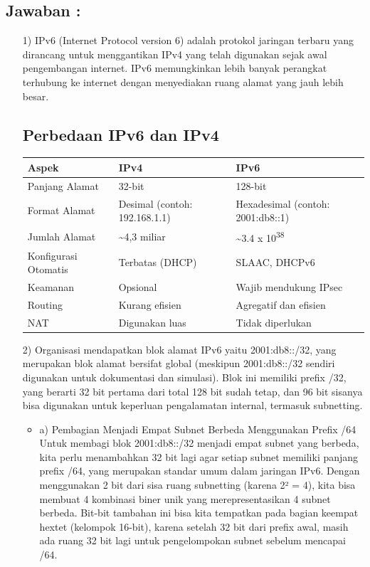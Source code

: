 \documentclass[12pt,a4paper]{article}
\begin{document}
\subsection*{Jawaban :}
\begin{itemize}
    \item[1)] IPv6 (Internet Protocol version 6) adalah protokol jaringan terbaru yang dirancang untuk menggantikan IPv4 yang telah digunakan sejak awal pengembangan internet. IPv6 memungkinkan lebih banyak perangkat terhubung ke internet dengan menyediakan ruang alamat yang jauh lebih besar.

\subsection*{Perbedaan IPv6 dan IPv4}

\begin{center}
\begin{tabular}{|l|l|l|}
\hline
\textbf{Aspek} & \textbf{IPv4} & \textbf{IPv6} \\
\hline
Panjang Alamat & 32-bit & 128-bit \\
\hline
Format Alamat & Desimal (contoh: 192.168.1.1) & Hexadesimal (contoh: 2001:db8::1) \\
\hline
Jumlah Alamat & \textasciitilde 4,3 miliar & \textasciitilde 3.4 x 10\textsuperscript{38} \\
\hline
Konfigurasi Otomatis & Terbatas (DHCP) & SLAAC, DHCPv6 \\
\hline
Keamanan & Opsional & Wajib mendukung IPsec \\
\hline
Routing & Kurang efisien & Agregatif dan efisien \\
\hline
NAT & Digunakan luas & Tidak diperlukan \\
\hline
\end{tabular}
\end{center}

\item[2)] Organisasi mendapatkan blok alamat IPv6 yaitu 2001:db8::/32, yang merupakan blok alamat bersifat global (meskipun 2001:db8::/32 sendiri digunakan untuk dokumentasi dan simulasi). Blok ini memiliki prefix /32, yang berarti 32 bit pertama dari total 128 bit sudah tetap, dan 96 bit sisanya bisa digunakan untuk keperluan pengalamatan internal, termasuk subnetting.
\begin{itemize}
    \item a) Pembagian Menjadi Empat Subnet Berbeda Menggunakan Prefix /64
Untuk membagi blok 2001:db8::/32 menjadi empat subnet yang berbeda, kita perlu menambahkan 32 bit lagi agar setiap subnet memiliki panjang prefix /64, yang merupakan standar umum dalam jaringan IPv6. Dengan menggunakan 2 bit dari sisa ruang subnetting (karena 2² = 4), kita bisa membuat 4 kombinasi biner unik yang merepresentasikan 4 subnet berbeda. Bit-bit tambahan ini bisa kita tempatkan pada bagian keempat hextet (kelompok 16-bit), karena setelah 32 bit dari prefix awal, masih ada ruang 32 bit lagi untuk pengelompokan subnet sebelum mencapai /64.\\


\end{itemize}
\end{itemize}
\end{document}

